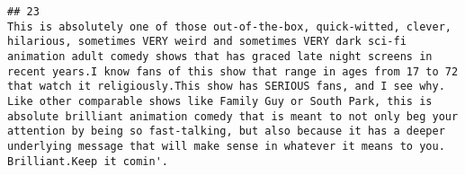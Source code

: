 \documentclass[
]{article}
\begin{document}
\begin{verbatim}
## 23                                                                                                                                                                                                                                                                                                                                                                                                                                                                                                                                                                                                                                                                                                                                                                                                                                                                                                                                                                                                                                                                                                                                                                                                                                                                                                                                                                                                                                                                                                                                                                                                                                                                                                                                                                                   This is absolutely one of those out-of-the-box, quick-witted, clever, hilarious, sometimes VERY weird and sometimes VERY dark sci-fi animation adult comedy shows that has graced late night screens in recent years.I know fans of this show that range in ages from 17 to 72 that watch it religiously.This show has SERIOUS fans, and I see why. Like other comparable shows like Family Guy or South Park, this is absolute brilliant animation comedy that is meant to not only beg your attention by being so fast-talking, but also because it has a deeper underlying message that will make sense in whatever it means to you. Brilliant.Keep it comin'.

\end{verbatim}
\end{document}
